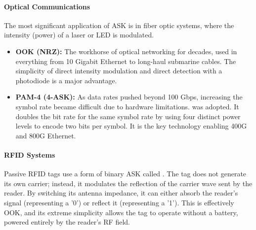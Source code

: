 \paragraph{Optical Communications}
The most significant application of ASK is in fiber optic systems, where the intensity (power) of a laser or LED is modulated.
\begin{itemize}
    \item \textbf{OOK (NRZ):} The workhorse of optical networking for decades, used in everything from 10 Gigabit Ethernet to long-haul submarine cables. The simplicity of direct intensity modulation and direct detection with a photodiode is a major advantage.
    \item \textbf{PAM-4 (4-ASK):} As data rates pushed beyond 100 Gbps, increasing the symbol rate became difficult due to hardware limitations.  was adopted. It doubles the bit rate for the same symbol rate by using four distinct power levels to encode two bits per symbol. It is the key technology enabling 400G and 800G Ethernet.
\end{itemize}

\paragraph{RFID Systems}
Passive RFID tags use a form of binary ASK called . The tag does not generate its own carrier; instead, it modulates the reflection of the carrier wave sent by the reader. By switching its antenna impedance, it can either absorb the reader's signal (representing a '0') or reflect it (representing a '1'). This is effectively OOK, and its extreme simplicity allows the tag to operate without a battery, powered entirely by the reader's RF field.


